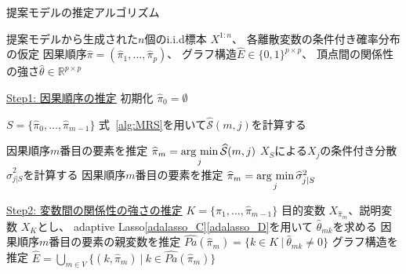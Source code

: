 \begin{algorithm}[t]
    \caption{提案モデルの推定アルゴリズム}
    \label{alg1}
    \begin{algorithmic}    %
      \REQUIRE 提案モデルから生成された$n$個のi.i.d標本 $X^{1:n}$、
               各離散変数の条件付き確率分布の仮定
      \ENSURE 因果順序$\widehat{\pi}=(\widehat{\pi}_1, \dots, \widehat{\pi}_p)$、
              グラフ構造$\widehat{E} \in \{ 0,1\}^{p \times p}$、
              頂点間の関係性の強さ$\widehat{\theta} \in \mathbb R^{p \times p}$

      \STATE \underline{Step1: 因果順序の推定}
      \STATE 初期化 $\widehat{\pi}_0 = \emptyset$

      \STATE $S = \{ \widehat{\pi}_0, \dots, \widehat{\pi}_{m-1} \}$
        \STATE 式~\eqref{alg:MRS}を用いて$\widehat{\mathcal S}(m,j)$を計算する
        \ENDFOR

        \STATE 因果順序$m$番目の要素を推定 $\widehat{\pi}_m = \mathop{\rm arg~min}\limits_{j} \widehat{\mathcal S}(m,j)$
        \ELSE
          \STATE $X_S$による$X_j$の条件付き分散 $\widehat{\sigma}_{j|S}^2$を計算する
          \ENDFOR
        \STATE 因果順序$m$番目の要素を推定 $\widehat{\pi}_m = \mathop{\rm arg~min}\limits_{j} \widehat{\sigma}_{j|S}^2$
        \ENDIF
      \ENDFOR

      \STATE \underline{Step2: 変数間の関係性の強さの推定}
      \STATE $K = \{ \widehat{\pi}_1, \dots, \widehat{\pi}_{m-1} \}$
      \STATE 目的変数 $X_{\widehat{\pi}_m}$、説明変数 $X_K$とし、
             adaptive Lasso\eqref{adalasso_C}\eqref{adalasso_D}を用いて
             $\widehat{\theta}_{mk}$を求める
      \STATE 因果順序$m$番目の要素の親変数を推定
             $\widehat{Pa}(\widehat{\pi}_m) = \{ k \in K \>|\> \widehat{\theta}_{mk} \neq 0 \}$
      \ENDFOR
      \STATE グラフ構造を推定
      $\widehat{E} = \bigcup_{m\in V}\{ (k,\widehat{\pi}_m)
      \>|\> k \in \widehat{Pa}(\widehat{\pi}_m) \}$

    \end{algorithmic}
\end{algorithm}
